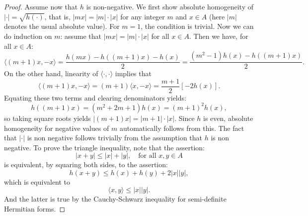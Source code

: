 \documentclass[a4paper, 12pt]{amsart}
\theoremstyle{definition}
\theoremstyle{plain}
\theoremstyle{plain}
\theoremstyle{plain}
\theoremstyle{plain}
\theoremstyle{remark}
\theoremstyle{remark}
\theoremstyle{plain}
\begin{document}
\begin{proof}
		Assume now that $h$ is non-negative. We first show absolute homogeneity of $|\cdot|=\sqrt{h(\cdot)}$, that is, $|mx|=|m|\cdot|x|$ for any integer $m$ and $x\in A$ (here $|m|$ denotes the usual absolute value). For $m=1$, the condition is trivial. Now we can do induction on $m$: assume that $|mx|=|m|\cdot|x|$ for all $x\in A$. Then we have, for all $x\in A$:
		\begin{equation*}
			\langle (m+1)x,-x\rangle=\frac{h(mx)-h((m+1)x)-h(x)}{2}=\frac{(m^2-1)h(x)-h((m+1)x)}{2}.
		\end{equation*}
		On the other hand, linearity of $\langle\cdot,\cdot\rangle$ implies that
		\begin{equation*}
			\langle (m+1)x,-x\rangle=(m+1)\langle x,-x\rangle=\frac{m+1}{2}[-2h(x)].
		\end{equation*}
		Equating these two terms and clearing denominators yields:
		\begin{equation*}
			h((m+1)x)=(m^2+2m+1)h(x)=(m+1)^2h(x),
		\end{equation*}
		so taking square roots yields $|(m+1)x|=|m+1|\cdot|x|$. Since $h$ is even, absolute homogeneity for negative values of $m$ automatically follows from this. The fact that $|\cdot|$ is non negative follows trivially from the assumption that $h$ is non negative. To prove the triangle inequality, note that the assertion:
		\begin{equation*}
			|x+y|\le |x|+|y|,\quad\text{for all } x,y\in A
		\end{equation*}
		is equivalent, by squaring both sides, to the assertion:
		\begin{equation*}
			h(x+y)\le h(x)+h(y)+2|x||y|,
		\end{equation*}
		which is equivalent to
		\begin{equation*}
			\langle x,y\rangle\le |x||y|.
		\end{equation*}
		And the latter is true by the Cauchy-Schwarz inequality for semi-definite Hermitian forms.
	\end{proof}
	
\end{document}
